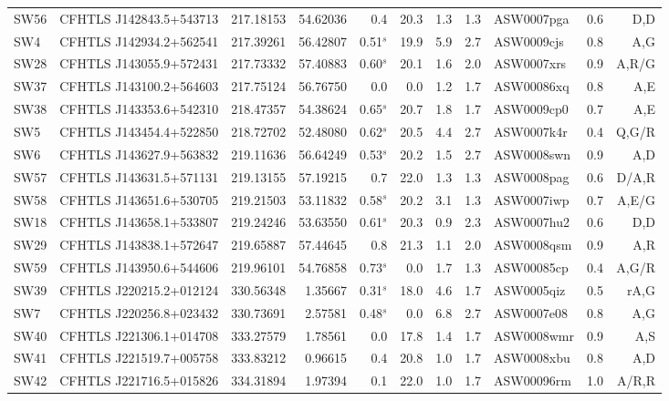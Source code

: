 \documentclass[useAMS,usenatbib,a4paper]{mn2e}
\begin{document}
\begin{center}
\begin{longtable}{llrrrrrrlrr}
SW56 & CFHTLS J142843.5+543713 & 217.18153 &  54.62036 &  0.4 & 20.3 &  1.3 &  1.3 & ASW0007pga &  0.6 &  D,D   \\ 
SW4 & CFHTLS J142934.2+562541 & 217.39261 &  56.42807 &  0.51$^s$ & 19.9 &  5.9 &  2.7 & ASW0009cjs &  0.8 &  A,G   \\ 
SW28 & CFHTLS J143055.9+572431 & 217.73332 &  57.40883 &  0.60$^s$ & 20.1 &  1.6 &  2.0 & ASW0007xrs &  0.9 &  A,R/G   \\ 
SW37 & CFHTLS J143100.2+564603 & 217.75124 &  56.76750 &  0.0 &  0.0 &  1.2 &  1.7 & ASW00086xq &  0.8 &  A,E   \\ 
SW38 & CFHTLS J143353.6+542310 & 218.47357 &  54.38624 &  0.65$^s$ & 20.7 &  1.8 &  1.7 & ASW0009cp0 &  0.7 &  A,E   \\ 
SW5 & CFHTLS J143454.4+522850 & 218.72702 &  52.48080 &  0.62$^s$ & 20.5 &  4.4 &  2.7 & ASW0007k4r &  0.4 &  Q,G/R   \\ 
SW6 & CFHTLS J143627.9+563832 & 219.11636 &  56.64249 &  0.53$^s$ & 20.2 &  1.5 &  2.7 & ASW0008swn &  0.9 &  A,D   \\ 
SW57 & CFHTLS J143631.5+571131 & 219.13155 &  57.19215 &  0.7 & 22.0 &  1.3 &  1.3 & ASW0008pag &  0.6 &  D/A,R   \\ 
SW58 & CFHTLS J143651.6+530705 & 219.21503 &  53.11832 &  0.58$^s$ & 20.2 &  3.1 &  1.3 & ASW0007iwp &  0.7 &  A,E/G   \\ 
SW18 & CFHTLS J143658.1+533807 & 219.24246 &  53.63550 &  0.61$^s$ & 20.3 &  0.9 &  2.3 & ASW0007hu2 &  0.6 &  D,D   \\ 
SW29 & CFHTLS J143838.1+572647 & 219.65887 &  57.44645 &  0.8 & 21.3 &  1.1 &  2.0 & ASW0008qsm &  0.9 &  A,R   \\ 
SW59 & CFHTLS J143950.6+544606 & 219.96101 &  54.76858 &  0.73$^s$ &  0.0 &  1.7 &  1.3 & ASW00085cp &  0.4 &  A,G/R   \\ 
SW39 & CFHTLS J220215.2+012124 & 330.56348 &   1.35667 &  0.31$^s$ & 18.0 &  4.6 &  1.7 & ASW0005qiz &  0.5 &  rA,G   \\ 
SW7 & CFHTLS J220256.8+023432 & 330.73691 &   2.57581 &  0.48$^s$ &  0.0 &  6.8 &  2.7 & ASW0007e08 &  0.8 &  A,G   \\ 
SW40 & CFHTLS J221306.1+014708 & 333.27579 &   1.78561 &  0.0 & 17.8 &  1.4 &  1.7 & ASW0008wmr &  0.9 &  A,S   \\ 
SW41 & CFHTLS J221519.7+005758 & 333.83212 &   0.96615 &  0.4 & 20.8 &  1.0 &  1.7 & ASW0008xbu &  0.8 &  A,D   \\ 
SW42 & CFHTLS J221716.5+015826 & 334.31894 &   1.97394 &  0.1 & 22.0 &  1.0 &  1.7 & ASW00096rm &  1.0 &  A/R,R   \\ 
\end{longtable}
\end{center}
\end{document}
